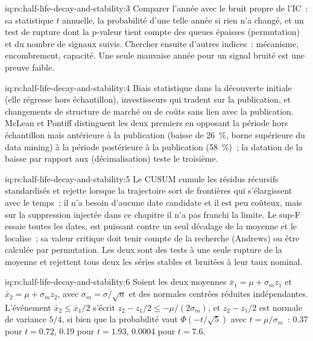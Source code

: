 \begin{solution}{iq:rs:half-life-decay-and-stability:3}
Comparer l'année avec le bruit propre de l'IC~: sa statistique $t$ annuelle, la probabilité d'une telle année si rien n'a changé, et un test de rupture
dont la p-valeur tient compte des queues épaisses (permutation) et du nombre de signaux suivis. Chercher ensuite d'autres indices~: mécanisme, encombrement,
capacité. Une seule mauvaise année pour un signal bruité est une preuve faible.
\end{solution}

\begin{solution}{iq:rs:half-life-decay-and-stability:4}
Biais statistique dans la découverte initiale (elle régresse hors échantillon), investisseurs qui tradent sur la publication, et changements de structure de marché
ou de coûts sans lien avec la publication. McLean et Pontiff distinguent les deux premiers en opposant la période hors échantillon mais antérieure à la publication (baisse de 26~\%,
borne supérieure du data mining) à la période postérieure à la publication (58~\%)~; la datation de la baisse par rapport aux  (décimalisation) teste le
troisième.
\end{solution}

\begin{solution}{iq:rs:half-life-decay-and-stability:5}
Le CUSUM cumule les résidus récursifs standardisés et rejette lorsque la trajectoire sort de frontières qui s'élargissent avec le temps~; il n'a besoin d'aucune date candidate
et il est peu coûteux, mais sur la suppression injectée dans ce chapitre il n'a pas franchi la limite. Le sup-F essaie toutes les dates, est puissant contre un seul décalage
de la moyenne et le localise~; sa valeur critique doit tenir compte de la recherche (Andrews) ou être calculée par permutation. Les deux sont des tests à une seule rupture de la moyenne et
rejettent tous deux les séries stables et bruitées à leur taux nominal.
\end{solution}

\begin{solution}{iq:rs:half-life-decay-and-stability:6}
Soient les deux moyennes $\bar x_1 = \mu + \sigma_m z_1$ et $\bar x_2 = \mu + \sigma_m z_2$, avec $\sigma_m = \sigma/\sqrt n$ et des
normales centrées réduites indépendantes. L'événement $\bar x_2 \le \bar x_1/2$ s'écrit $z_2 - z_1/2 \le -\mu/(2\sigma_m)$, et $z_2 - z_1/2$ est normale de variance $5/4$, si bien que la probabilité
vaut $\Phi(-t/\sqrt5)$ avec $t = \mu/\sigma_m$~: 0.37 pour $t = 0.72$, 0.19 pour $t = 1.93$, 0.0004 pour $t = 7.6$.
\end{solution}
